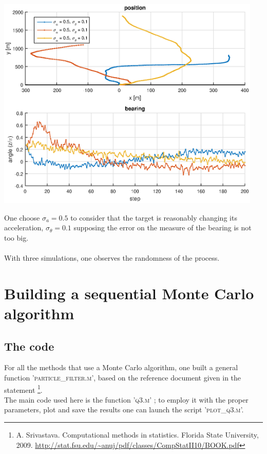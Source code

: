 \documentclass[english,DIV=13]{scrartcl}
\begin{document}
\begin{itemize}
\begin{center}
	\begin{minipage}{.5\textwidth}
   		\includegraphics[width=0.95\textwidth]{img/q2_5.eps}
	\end{minipage}%
	\begin{minipage}{.5\textwidth}
		One choose 	$\sigma_a=0.5$ to consider that the target is reasonably changing its acceleration, 
		$\sigma_{\theta}=0.1$ supposing the error on the measure of the bearing is not too big. \\\\
		With three simulations, one observes the randomness of the process.
	\end{minipage}
\end{center}
\end{itemize}



\section{Building a sequential Monte Carlo algorithm}
\subsection*{The code}
For all the methods that use a Monte Carlo algorithm, one built a general function 
'\textsc{particle\_filter.m}', based on the reference document given in the statement
\footnote{A. Srivastava. Computational methods in statistics. Florida State University, 2009.
\url{http://stat.fsu.edu/~anuj/pdf/classes/CompStatII10/BOOK.pdf}}.\\
The main code used here is the function '\textsc{q3.m}' ; to employ it with the proper
parameters, plot and save the results one can launch the script '\textsc{plot\_q3.m}'.
\end{document}
